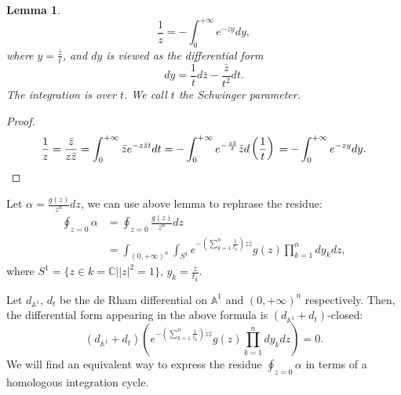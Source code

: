 \documentclass[11pt]{amsart}
\newtheorem{lem}[thm]{Lemma}
\theoremstyle{definition}
\theoremstyle{remark}
\numberwithin{equation}{section}
\renewcommand{\AA}{\mathbb{A}}
\begin{document}
\begin{lem}
    $$
    \frac{1}{z}=-\int_{0}^{+\infty}e^{-zy}dy,
    $$
    where $y=\frac{\bar{z}}{t}$, and $dy$ is viewed as the differential form $$dy=\frac{1}{t} d\bar{z}-\frac{\bar{z}}{t^2} d t.$$
    The integration is over $t$. We call $t$ the Schwinger parameter.
\end{lem}
\begin{proof}
  \begin{equation}
        \frac{1}{z} =\frac{\bar{z}}{z\bar{z}}\\
    =
\int_{0}^{+\infty}\bar{z}e^{-z\bar{z}t}dt\\
        =
        -\int_{0}^{+\infty}e^{-\frac{z\bar{z}}{t}}\bar{z}d\left(\frac{1}{t}\right)\\
        =
-\int_{0}^{+\infty}e^{-zy}dy.
\end{equation}
\end{proof}

Let $\alpha=\frac{g(z)}{z^{n}}dz$, we can use above lemma to rephrase the residue:
\begin{align*}
\oint_{z=0}\alpha 
&=
\oint_{z=0}\frac{g(z)}{z^{n}}dz \\
&=
\int_{(0,+\infty)^{n}}\int_{S^{1}}e^{-\left(\sum_{k=1}^{n}\frac{1}{t_{k}}\right)z\bar{z}}g(z)\prod_{k=1}^{n}dy_{k}dz,
\end{align*}
where $S^{1}=\{z\in k=\mathbb{C}||z|^2=1\}$, $y_{k}=\frac{\bar{z}}{t_{k}}$.

Let $d_{\mathbb{A}^{1}}$, $d_{t}$ be the de Rham differential on $\mathbb{A}^{1}$ and $(0,+\infty)^{n}$ respectively.
Then, the differential form appearing in the above formula is $(d_{\AA^{1}} + d_{t})$-closed:
$$
(d_{\mathbb{A}^{1}}+d_{t}) \left(e^{-\left(\sum_{k=1}^{n}\frac{1}{t_{k}}\right)z\bar{z}}g(z)\prod_{k=1}^{n}dy_{k}dz\right)=0.
$$
We will find an equivalent way to express the residue $\oint_{z=0} \alpha$ in terms of a homologous integration cycle.
\end{document}
